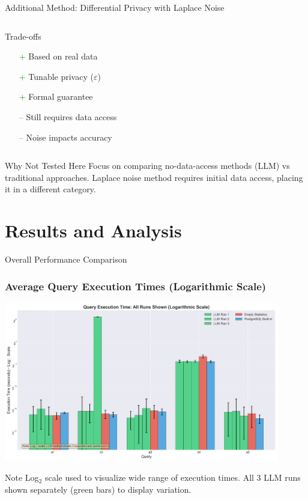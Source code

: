 \documentclass{beamer}
\begin{document}
\begin{frame}{Additional Method: Differential Privacy with Laplace Noise}
\begin{columns}[T]
\begin{column}{0.5\textwidth}
\begin{alertblock}{Trade-offs}
\begin{itemize}
    \item[\textcolor{green}{+}] Based on real data
    \item[\textcolor{green}{+}] Tunable privacy ($\varepsilon$)
    \item[\textcolor{green}{+}] Formal guarantee
    \item[\textcolor{red}{--}] Still requires data access
    \item[\textcolor{red}{--}] Noise impacts accuracy
\end{itemize}
\end{alertblock}
\end{column}
\end{columns}

\vspace{0.3cm}

\begin{block}{Why Not Tested Here}
Focus on comparing no-data-access methods (LLM) vs traditional approaches. Laplace noise method requires initial data access, placing it in a different category.
\end{block}

\end{frame}

\section{Results and Analysis}

\begin{frame}{Overall Performance Comparison}
\frametitle{Average Query Execution Times (Logarithmic Scale)}

\begin{center}
\includegraphics[width=0.9\textwidth]{images/execution_time_comparison.png}
\end{center}

\begin{alertblock}{Note}
Log$_2$ scale used to visualize wide range of execution times. All 3 LLM runs shown separately (green bars) to display variation.
\end{alertblock}

\end{frame}
\end{document}
